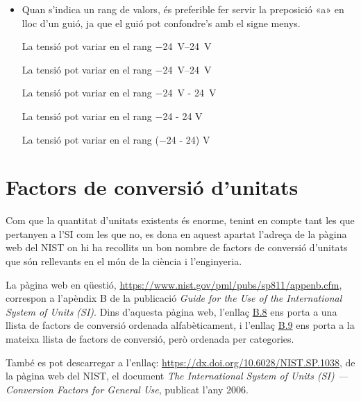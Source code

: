 \begin{itemize}
\textcolor{Green}\faCheckSquare{} $240 \times (1 \pm \qty{10}{\percent})\unit{\,V}$

\textcolor{Blue}\faExclamationTriangle{}  $\qty{240}{V} \pm \qty{10}{\percent}$


\item Quan s'indica un rang de valors, és preferible fer servir la preposició «a» en lloc d'un guió, ja que el guió pot confondre's amb el signe menys.

\textcolor{Green}\faCheckSquare{} La tensió pot variar en el rang \qtyrange{-24}{24}{V}

\textcolor{Green}\faCheckSquare{} La tensió pot variar en el rang \qtyrange[range-units = bracket]{-24}{24}{V}

\textcolor{Blue}\faExclamationTriangle{}  La tensió pot variar en el rang \qty{-24}{V} - \qty{24}{V}

\textcolor{Blue}\faExclamationTriangle{} La tensió pot variar en el rang \num{-24} - 24 V 

\textcolor{Blue}\faExclamationTriangle{} La tensió pot variar en el rang (\num{-24} - 24) V 

\end{itemize}


\section{Factors de conversió d'unitats}\label{sec:SI-fact-conv}
Com que la quantitat d'unitats existents és enorme, tenint en compte tant les que pertanyen a l'SI com les que no, es dona en aquest apartat l'adreça de la pàgina web del NIST on hi ha recollits un bon nombre de factors de conversió d'unitats que són rellevants en el món de la ciència i l'enginyeria.

La pàgina web en  qüestió, \href{https://www.nist.gov/pml/pubs/sp811/appenb.cfm}{https:/\!\!/www.nist.gov/pml/pubs/sp811/appenb.cfm}, correspon a l'apèndix B de la publicació \textit{Guide for the Use of the International System of Units (SI)}.
Dins d'aquesta pàgina web, l'enllaç \href{https://www.nist.gov/pml/pubs/sp811/appenb8.cfm}{B.8} ens porta a una llista de factors de conversió ordenada alfabèticament, i l'enllaç  \href{https://www.nist.gov/pml/pubs/sp811/appenb9.cfm}{B.9} ens porta a la mateixa llista de factors de conversió, però ordenada per categories.

També es pot descarregar a l'enllaç: \href{https://dx.doi.org/10.6028/NIST.SP.1038}{https:/\!\!/dx.doi.org/10.6028/NIST.SP.1038}, de la pàgina web del NIST, el document \textit{The International System of Units (SI) --- Conversion Factors
for General Use}, publicat l'any 2006.

